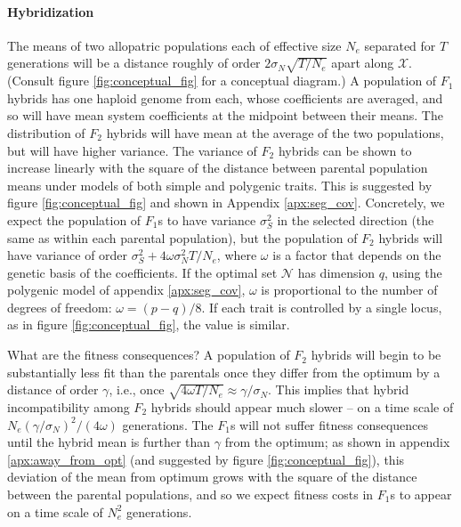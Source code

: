 \documentclass{article}
\newcommand{\1}{\mathbbm{1}}
\newcommand{\allS}{\mathcal{N}}
\newcommand{\optx}{\mathcal{X}}
\begin{document}
\paragraph{Hybridization}
The means of two allopatric populations each of effective size $N_e$ separated for $T$ generations
will be a distance roughly of order $2\sigma_N \sqrt{T/N_e}$ apart along $\optx$.
(Consult figure \ref{fig:conceptual_fig} for a conceptual diagram.)
A population of $F_1$ hybrids has one haploid genome from each,
whose coefficients are averaged,
and so will have mean system coefficients at the midpoint between their means.
The distribution of $F_2$ hybrids will have mean at the average of the two populations,
but will have higher variance.
The variance of $F_2$ hybrids can be shown to increase linearly with the square of the distance between
parental population means
under models of both simple and polygenic traits.
This is suggested by figure \ref{fig:conceptual_fig} and shown in Appendix \ref{apx:seg_cov}.
Concretely, we expect the population of $F_1$s to have variance $\sigma^2_S$ in the selected direction
(the same as within each parental population),
but the population of $F_2$ hybrids will have variance of order $\sigma^2_S + 4 \omega \sigma^2_N T/N_e$,
where $\omega$ is a factor that depends on the genetic basis of the coefficients.
If the optimal set $\allS$ has dimension $q$,
using the polygenic model of appendix \ref{apx:seg_cov}, 
$\omega$ is proportional to the number of degrees of freedom: $\omega = (p-q)/8$.
If each trait is controlled by a single locus, as in figure \ref{fig:conceptual_fig},
the value is similar.


What are the fitness consequences?
A population of $F_2$ hybrids will begin to be substantially less fit than the parentals
once they differ from the optimum by a distance of order $\gamma$,
i.e., once $\sqrt{4 \omega T/N_e} \approx \gamma / \sigma_N$.
This implies that hybrid incompatibility among $F_2$ hybrids should appear much slower --
on a time scale of $N_e (\gamma / \sigma_N)^2 / (4 \omega)$ generations.
The $F_1$s will not suffer fitness consequences until the hybrid mean is further than $\gamma$ from the optimum;
as shown in appendix \ref{apx:away_from_opt} (and suggested by figure \ref{fig:conceptual_fig}),
this deviation of the mean from optimum grows with the square of the distance between the parental populations,
and so we expect fitness costs in $F_1$s to appear on a time scale of $N_e^2$ generations.
\end{document}
